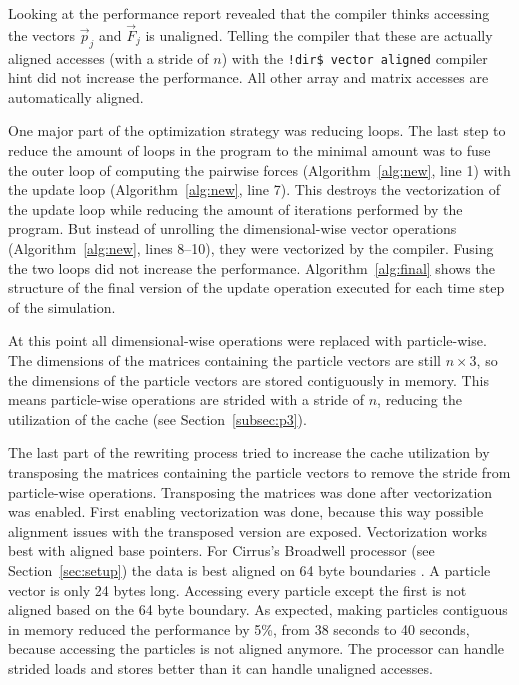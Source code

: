 \documentclass[twoside,11pt]{article}
\begin{document}
Looking at the performance report revealed that the compiler thinks
accessing the vectors $\vec{p}_j$ and $\vec{F}_j$ is unaligned.
Telling the compiler that these are actually aligned accesses (with a
stride of $n$) with the \texttt{!dir\$ vector aligned} compiler hint
did not increase the performance.
All other array and matrix accesses are automatically aligned.

One major part of the optimization strategy was reducing loops.
The last step to reduce the amount of loops in the program to the
minimal amount was to fuse the outer loop of computing the
pairwise forces (Algorithm~\ref{alg:new}, line 1) with the update loop
(Algorithm~\ref{alg:new}, line 7).
This destroys the vectorization of the update loop while reducing the
amount of iterations performed by the program.
But instead of unrolling the dimensional-wise vector operations
(Algorithm~\ref{alg:new}, lines 8--10), they were vectorized by the
compiler.
Fusing the two loops did not increase the performance.
Algorithm~\ref{alg:final} shows the structure of the final version of
the update operation executed for each time step of the simulation.

At this point all dimensional-wise operations were replaced with
particle-wise.
The dimensions of the matrices containing the particle vectors are
still $n \times 3$, so the dimensions of the particle vectors are
stored contiguously in memory.
This means particle-wise operations are strided with a stride of $n$,
reducing the utilization of the cache (see Section~\ref{subsec:p3}).

The last part of the rewriting process tried to increase the cache
utilization by transposing the matrices containing the particle
vectors to remove the stride from particle-wise operations.
Transposing the matrices was done after vectorization was enabled.
First enabling vectorization was done, because this way possible
alignment issues with the transposed version are exposed.
Vectorization works best with aligned base pointers.
For Cirrus's Broadwell processor (see Section~\ref{sec:setup}) the
data is best aligned on 64 byte boundaries \citep{krishnaiyer2015}.
A particle vector is only 24 bytes long.
Accessing every particle except the first is not aligned based on the
64 byte boundary.
As expected, making particles contiguous in memory reduced the
performance by 5\%, from 38 seconds to 40 seconds, because accessing
the particles is not aligned anymore.
The processor can handle strided loads and stores better than it can
handle unaligned accesses.
\end{document}
